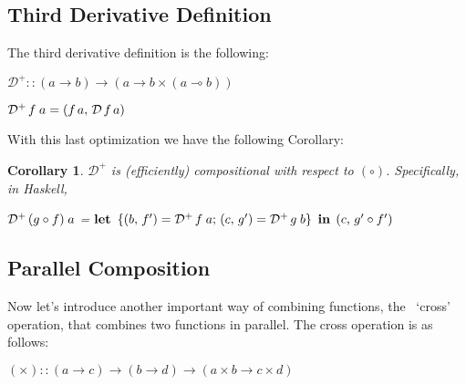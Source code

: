 \documentclass[11pt,a4]{article}
\newtheorem{coro}{Corollary}[section]
\theoremstyle{definition}
\theoremstyle{Definition}
\theoremstyle{Definition}
\begin{document}
	
	\subsection{Third Derivative Definition}
	
	The third derivative definition is the following:
	
	$\mathcal{D}^{+} :: (a \to b) \to (a \to b \times (a \multimap b))$
	
	$\mathcal{D}^{+} \hspace{0.5mm} f \hspace{0.9mm} a = (f \hspace{0.5mm} a,\hspace{0.5mm} \mathcal{D} \hspace{0.5mm} f \hspace{0.5mm} a )$
	
	With this last optimization we have the following Corollary: 
	
	\begin{coro}
		$\mathcal{D}^{+}$ is (efficiently) compositional with 
		respect to $(\circ)$. Specifically, in \newline Haskell,
		
		\quad $\mathcal{D}^{+} \hspace{0.5mm} (g \circ f) \hspace{0.9mm} a$ = $\bf let$  $\{(b,\hspace{0.5mm} f') = \mathcal{D}^{+} \hspace{0.5mm} f \hspace{0.9mm} a; \hspace{0.5mm} (c,\hspace{0.5mm} g')=\mathcal{D}^{+} \hspace{0.5mm} g \hspace{0.9mm} b \}$ $\bf in$  $(c,\hspace{0.5mm} g' \circ f') $
	\end{coro}
	
	\subsection{Parallel Composition}
	
	Now let's introduce another important way of combining functions, the \ \enquote*{cross} operation, that combines two functions in parallel. The cross operation is as follows:
	
	$(\boldsymbol{\times}) :: (a \to c) \to (b \to d) \to (a \times b \to c \times d)$
	
\end{document}
